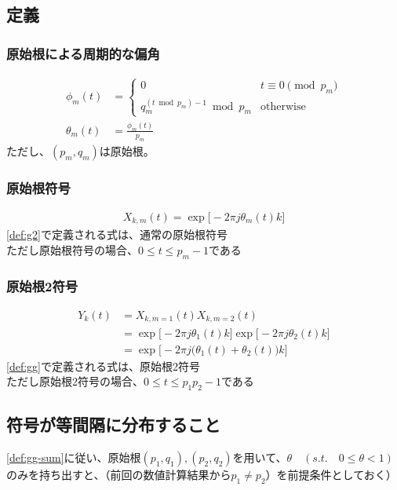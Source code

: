 \documentclass[platex]{jsarticle}
\date{2023/11/04}
\newcommand{\expb}[1]{\exp \biggl[ #1 \biggr]}
\begin{document}
\subsection{定義}

\subsubsection{原始根による周期的な偏角}

\begin{align}
\phi_m(t) &=
\begin{cases}
0 & t \equiv 0 \pmod{p_m} \\
q_m^{(t\bmod p_m)-1}　\bmod　p_m & \text{otherwise} 
\end{cases} \\
\theta_m(t) &= \frac{\phi_m(t)}{p_m}
\end{align}
ただし、$(p_m,q_m)$は原始根。

\subsubsection{原始根符号}

\begin{gather}
X_{k,m}(t) = \expb{-2 \pi j \theta_m(t) k} \label{def:g2}
\end{gather}
\eqref{def:g2}で定義される式は、通常の原始根符号 \\
ただし原始根符号の場合、$0 \leq t \leq p_m -1$である

\subsubsection{原始根2符号}

\begin{align}Y_k(t) &= X_{k,m=1}(t) X_{k,m=2}(t) \label{def:gg} \\
&= \expb{-2 \pi j \theta_1(t) k} \expb{-2 \pi j \theta_2(t) k} \\
&= \expb{-2 \pi j \biggl( \theta_1(t)+\theta_2(t) \biggr) k} \label{def:gg-sum}
\end{align}
\eqref{def:gg}で定義される式は、原始根2符号 \\
ただし原始根2符号の場合、$0 \leq t \leq p_1p_2 -1$である


\subsection{符号が等間隔に分布すること}
\eqref{def:gg-sum}に従い、原始根$(p_1,q_1),(p_2,q_2)$を用いて、$\theta \quad (s.t. \quad 0 \leq \theta < 1)$のみを持ち出すと、（前回の数値計算結果から$p_1 \not = p_2$）を前提条件としておく）
\end{document}
